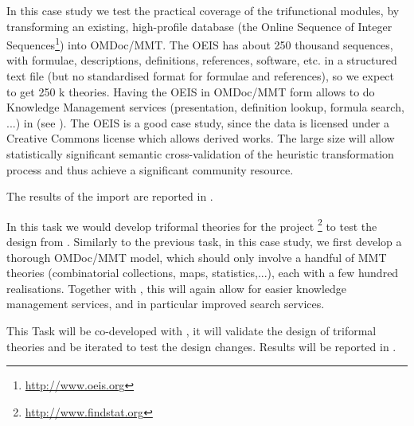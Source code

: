 \begin{workpackage}[id=dksbases,%
  title=Data/Knowledge/Software-Bases,lead=FAU,
  ZHRM=12,JURM=12,FAURM=34,UWRM=25,SARM=10,LLRM=2,PSRM=25]
\begin{tasklist}
\begin{task}[title=OEIS Case Study (Coverage and automated Import),id=data-OEIS,lead=FAU,partners={JU},
  PM=6,wphases=12-18,issue=128]
In this case study we test the practical coverage of the trifunctional modules, by
transforming an existing, high-profile database (the Online Sequence of Integer
Sequences\footnote{\url{http://www.oeis.org}}) into OMDoc/MMT. The OEIS has about 250
thousand sequences, with formulae, descriptions, definitions, references, software,
etc. in a structured text file (but no standardised format for formulae and references),
so we expect to get 250 k theories. Having the OEIS in OMDoc/MMT form allows to do
Knowledge Management services (presentation, definition lookup, formula search, ...) in
\MathHub (see ). The OEIS is a good case study, since the data is licensed under
a Creative Commons license which allows derived works. The large size will allow
statistically significant semantic cross-validation of the heuristic transformation
process and thus achieve a significant community resource.

The results of the import are reported in .
\end{task}


\begin{task}[title=FindStat Case Study (Triformal Theories),id=data-findstat,
  lead=FAU,partners={ZH},PM=9,wphases=18-30!.5,issue=129]
  In this task we would develop triformal theories for the \FindStat project \footnote{\url{http://www.findstat.org}} to test the
  design from .  Similarly to the previous task, in this
  case study, we first develop a thorough OMDoc/MMT model, which should only involve a
  handful of MMT theories (combinatorial collections, maps, statistics,...), each with a
  few hundred realisations. Together with   , this will again allow for
  easier knowledge management services, and in particular improved search services.

  This Task will be co-developed with , it will validate
  the design of triformal theories and be iterated to test the design changes. Results
  will be reported in .
\end{task}


\end{tasklist}
\end{workpackage}
